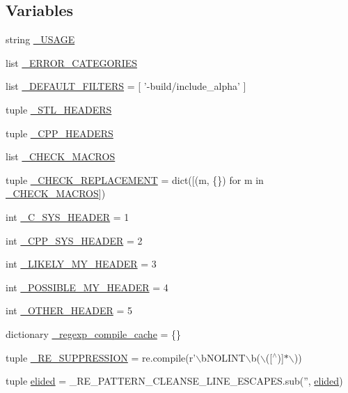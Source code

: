 \subsection*{Variables}
\begin{DoxyCompactItemize}
\item 
string \hyperlink{namespacecpplint_afefe1ab8eeab7350e1a7d96d41c86fb8}{\_\-USAGE}
\item 
list \hyperlink{namespacecpplint_a7a498bc09903cee9029cccc023641ede}{\_\-ERROR\_\-CATEGORIES}
\item 
list \hyperlink{namespacecpplint_a40307223380a2e065996f7113e2f8f4c}{\_\-DEFAULT\_\-FILTERS} = \mbox{[} '-\/build/include\_\-alpha' \mbox{]}
\item 
tuple \hyperlink{namespacecpplint_a76f8ec9e9e1ea46197f611bd5a995962}{\_\-STL\_\-HEADERS}
\item 
tuple \hyperlink{namespacecpplint_a8b16f3827d7722217dd3a2f50f24087d}{\_\-CPP\_\-HEADERS}
\item 
list \hyperlink{namespacecpplint_aab5915e25e8ef5ed9d9c223a5183d6bc}{\_\-CHECK\_\-MACROS}
\item 
tuple \hyperlink{namespacecpplint_ad966b15edc61d0e0fa98cf4ce1a0135a}{\_\-CHECK\_\-REPLACEMENT} = dict(\mbox{[}(m, \{\}) for m in \hyperlink{namespacecpplint_aab5915e25e8ef5ed9d9c223a5183d6bc}{\_\-CHECK\_\-MACROS}\mbox{]})
\item 
int \hyperlink{namespacecpplint_a6703b407df0f07ff6162c225070ddc9e}{\_\-C\_\-SYS\_\-HEADER} = 1
\item 
int \hyperlink{namespacecpplint_a89c3b71932122fc90afd2f47c07574f4}{\_\-CPP\_\-SYS\_\-HEADER} = 2
\item 
int \hyperlink{namespacecpplint_a5d6aba92ab2575ff645a1aacad5b5216}{\_\-LIKELY\_\-MY\_\-HEADER} = 3
\item 
int \hyperlink{namespacecpplint_a40cf12907322271bf94416a9fe602d96}{\_\-POSSIBLE\_\-MY\_\-HEADER} = 4
\item 
int \hyperlink{namespacecpplint_ace812856f1cd6c6b4375ab5c92294323}{\_\-OTHER\_\-HEADER} = 5
\item 
dictionary \hyperlink{namespacecpplint_a3eea0656ee957fff7d4511579c92d250}{\_\-regexp\_\-compile\_\-cache} = \{\}
\item 
tuple \hyperlink{namespacecpplint_af6a02614cf018ab890ede0b3a936ba6e}{\_\-RE\_\-SUPPRESSION} = re.compile(r'$\backslash$bNOLINT$\backslash$b($\backslash$(\mbox{[}$^\wedge$)\mbox{]}$\ast$$\backslash$))
\item 
tuple \hyperlink{namespacecpplint_a8559d5bdf881337b323a7253a71a5fed}{elided} = \_\-RE\_\-PATTERN\_\-CLEANSE\_\-LINE\_\-ESCAPES.sub('', \hyperlink{namespacecpplint_a8559d5bdf881337b323a7253a71a5fed}{elided})
\end{DoxyCompactItemize}


